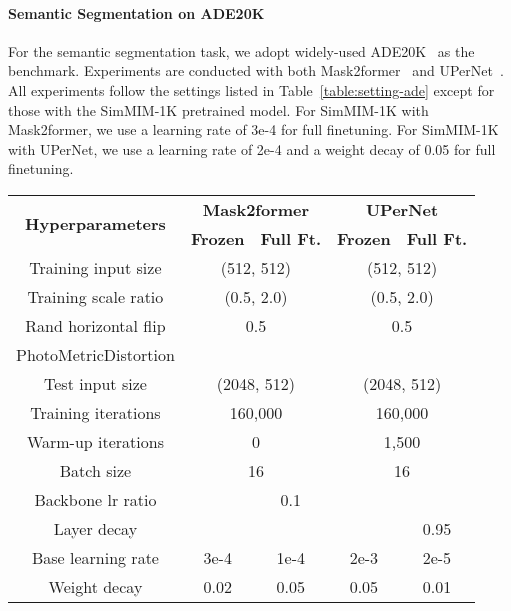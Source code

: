 \documentclass{article}
\newcommand{\cmark}{\text{\ding{51}}}
\newcommand{\xmark}{\text{\ding{55}}}
\begin{document}
\paragraph{Semantic Segmentation on ADE20K}

For the semantic segmentation task, we adopt widely-used ADE20K~\cite{zhou2018ade} as the benchmark. Experiments are conducted with both Mask2former~\cite{mask2former} and UPerNet~\cite{xiao2018upernet}. All experiments follow the settings listed in Table~\ref{table:setting-ade} except for those with the SimMIM-1K pretrained model. For SimMIM-1K with Mask2former, we use a learning rate of 3e-4 for full finetuning. For SimMIM-1K with UPerNet, we use a learning rate of 2e-4 and a weight decay of 0.05 for full finetuning.  

\begin{table}[h]\small
    \centering \begin{tabular}{c|cc|cc}
    \toprule
    \multirow{2}{*}{\textbf{Hyperparameters}} & \multicolumn{2}{c|}{\textbf{Mask2former}} & \multicolumn{2}{c}{\textbf{UPerNet}} \\
    & \textbf{Frozen} & \textbf{Full Ft.} & \textbf{Frozen} & \textbf{Full Ft.} \\
    \hline
    Training input size & \multicolumn{2}{c|}{(512, 512)} & \multicolumn{2}{c}{(512, 512)} \\
    Training scale ratio & \multicolumn{2}{c|}{(0.5, 2.0)} & \multicolumn{2}{c}{(0.5, 2.0)} \\
    Rand horizontal flip & \multicolumn{2}{c|}{0.5} & \multicolumn{2}{c}{0.5} \\
    PhotoMetricDistortion & \multicolumn{2}{c|}{\cmark} & \multicolumn{2}{c}{\cmark} \\
    Test input size & \multicolumn{2}{c|}{(2048, 512)} &  \multicolumn{2}{c}{(2048, 512)} \\
    \hline
    Training iterations & \multicolumn{2}{c|}{160,000} & \multicolumn{2}{c}{160,000} \\
    Warm-up iterations & \multicolumn{2}{c|}{0} & \multicolumn{2}{c}{1,500} \\
    Batch size & \multicolumn{2}{c|}{16} & \multicolumn{2}{c}{16} \\
    Backbone lr ratio & \xmark & 0.1 & \xmark & \xmark  \\
    Layer decay & \xmark & \xmark & \xmark & 0.95 \\
    Base learning rate & 3e-4 & 1e-4 & 2e-3 & 2e-5 \\
    Weight decay & 0.02 & 0.05 & 0.05 & 0.01 \\

\end{tabular}
\end{table}
\end{document}

